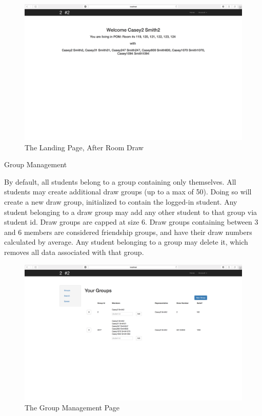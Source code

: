 \begin{outline}
\begin{figure}[H] \centering
\includegraphics[scale=.225]{screens/landing_drawn}
\caption{The Landing Page, After Room Draw}
\label{fig:screenlandingdrawn}
\end{figure}

\1 Group Management

  \2 By default, all students belong to a group containing only themselves.
  \2 All students may create additional draw groups (up to a max of 50). Doing
  so will create a new draw group, initialized to contain the logged-in student.
  \2 Any student belonging to a draw group may add any other student to that
  group via student id. Draw groups are capped at size 6. Draw groups containing
  between 3 and 6 members are considered friendship groups, and have their draw
  numbers calculated by average.
  \2 Any student belonging to a group may delete it, which removes all data
  associated with that group.

\begin{figure}[H] \centering
\includegraphics[scale=.225]{screens/group}
\caption{The Group Management Page}
\label{fig:screengroup}
\end{figure}


\end{outline}
